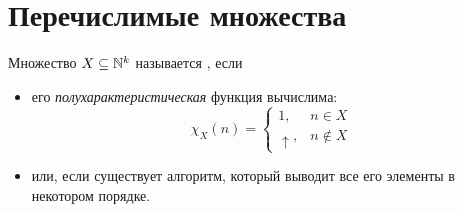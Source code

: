 \section{Перечислимые множества}

\begin{defn}
	Множество $ X \subseteq \mathbb{N}^{k}$ называется , если 
	\begin{itemize}
		\item его \textit{полухарактеристическая} функция вычислима:
		\[
			\chi_{X}(n) = \begin{cases}
				1, & n \in  X\\
				\uparrow, & n \notin X
			\end{cases}
		\] 
		\item 	или, если существует алгоритм, который выводит все его элементы в некотором порядке.
	\end{itemize}
\end{defn}

